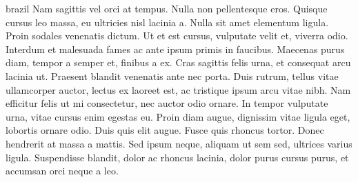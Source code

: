 \begin{otherlanguage*}{brazil}
        Nam sagittis vel orci at tempus. Nulla non pellentesque eros.
        Quisque cursus leo massa, eu ultricies nisl lacinia a. Nulla sit amet elementum ligula.
        Proin sodales venenatis dictum. Ut et est cursus, vulputate velit et, viverra odio. Interdum
        et malesuada fames ac ante ipsum primis in faucibus. Maecenas purus diam, tempor a semper
        et, finibus a ex. Cras sagittis felis urna, et consequat arcu lacinia ut. Praesent blandit
        venenatis ante nec porta. Duis rutrum, tellus vitae ullamcorper auctor, lectus ex laoreet
        est, ac tristique ipsum arcu vitae nibh. Nam efficitur felis ut mi consectetur, nec auctor
        odio ornare. In tempor vulputate urna, vitae cursus enim egestas eu. Proin diam augue,
        dignissim vitae ligula eget, lobortis ornare odio. Duis quis elit augue. Fusce quis rhoncus
        tortor. Donec hendrerit at massa a mattis. Sed ipsum neque, aliquam ut sem sed, ultrices
        varius ligula. Suspendisse blandit, dolor ac rhoncus lacinia, dolor purus cursus purus, et
        accumsan orci neque a leo.



    \end{otherlanguage*}


\else
\fi

\makeatother

